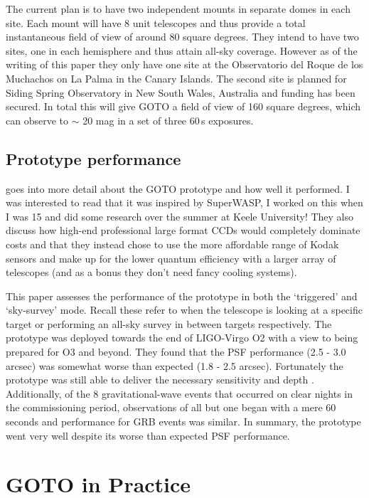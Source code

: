 \documentclass[twocolumn]{aastex631}
\begin{document}
The current plan is to have two independent mounts in separate domes in each site. Each mount will have 8 unit telescopes and thus provide a total instantaneous field of view of around 80 square degrees. They intend to have two sites, one in each hemisphere and thus attain all-sky coverage. However as of the writing of this paper they only have one site at the Observatorio del Roque de los Muchachos on La Palma in the Canary Islands. The second site is planned for Siding Spring Observatory in New South Wales, Australia and funding has been secured. In total this will give GOTO a field of view of 160 square degrees, which can observe to $\sim$ 20 mag in a set of three 60\,s exposures.

\subsection{Prototype performance}
\citet{Steeghs+2022} goes into more detail about the GOTO prototype and how well it performed. I was interested to read that it was inspired by SuperWASP, I worked on this when I was 15 and did some research over the summer at Keele University! They also discuss how high-end professional large format CCDs would completely dominate costs and that they instead chose to use the more affordable range of Kodak sensors and make up for the lower quantum efficiency with a larger array of telescopes (and as a bonus they don't need fancy cooling systems).

This paper assesses the performance of the prototype in both the `triggered' and `sky-survey' mode. Recall these refer to when the telescope is looking at a specific target or performing an all-sky survey in between targets respectively. The prototype was deployed towards the end of LIGO-Virgo O2 with a view to being prepared for O3 and beyond. They found that the PSF performance (2.5 - 3.0 arcsec) was somewhat worse than expected (1.8 - 2.5 arcsec). Fortunately the prototype was still able to deliver the necessary sensitivity and depth \citep[see][Fig.~9]{Steeghs+2022}. Additionally, of the 8 gravitational-wave events that occurred on clear nights in the commissioning period, observations of all but one began with a mere 60 seconds and performance for GRB events was similar. In summary, the prototype went very well despite its worse than expected PSF performance.

\section{GOTO in Practice}
\end{document}

